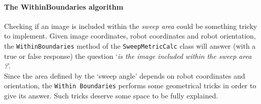 \paragraph{The WithinBoundaries algorithm}
\label{par:withinboundaries}

Checking if an image is included within the \textit{sweep area}
could be something tricky to implement. Given image coordinates, 
robot coordinates and robot orientation, the \texttt{WithinBoundaries} 
method of the \texttt{SweepMetricCalc} class 
will answer (with a true or false response) the question
`\textit{is the image included within the sweep area ?}'.
\\
Since the area defined by the `sweep angle' depends on robot 
coordinates and orientation, the \texttt{Within Boundaries}
performs some geometrical tricks in order to give its answer. 
Such tricks deserve some space to be fully explained.

